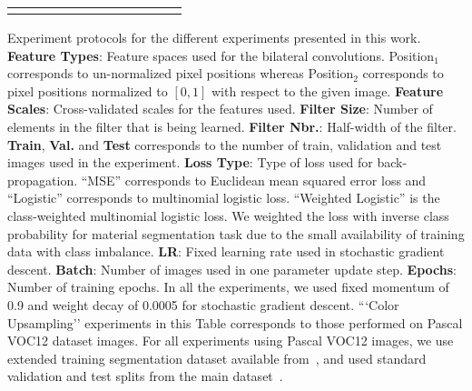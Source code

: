 \begin{table*}[h]
\begin{tabular}{L{2.5cm} L{2.8cm} C{1.6cm} C{0.8cm} C{0.6cm} C{0.7cm} C{0.7cm} C{0.7cm} C{1.6cm} C{0.7cm} C{0.7cm} C{0.7cm}}
      \bottomrule
      \\
    \end{tabular}
     {Experiment protocols for the different experiments presented in this work. \textbf{Feature Types}:
    Feature spaces used for the bilateral convolutions. Position$_1$ corresponds to un-normalized pixel positions whereas Position$_2$ corresponds
    to pixel positions normalized to $[0,1]$ with respect to the given image. \textbf{Feature Scales}: Cross-validated scales for the features used.
     \textbf{Filter Size}: Number of elements in the filter that is being learned. \textbf{Filter Nbr.}: Half-width of the filter. \textbf{Train},
     \textbf{Val.} and \textbf{Test} corresponds to the number of train, validation and test images used in the experiment. \textbf{Loss Type}: Type
     of loss used for back-propagation. ``MSE'' corresponds to Euclidean mean squared error loss and ``Logistic'' corresponds to multinomial logistic
     loss. ``Weighted Logistic'' is the class-weighted multinomial logistic loss. We weighted the loss with inverse class probability for material
     segmentation task due to the small availability of training data with class imbalance. \textbf{LR}: Fixed learning rate used in stochastic gradient
     descent. \textbf{Batch}: Number of images used in one parameter update step. \textbf{Epochs}: Number of training epochs. In all the experiments,
     we used fixed momentum of 0.9 and weight decay of 0.0005 for stochastic gradient descent. ```Color Upsampling'' experiments in this Table corresponds
     to those performed on Pascal VOC12 dataset images. For all experiments using Pascal VOC12 images, we use extended
     training segmentation dataset available from~\cite{hariharan2011moredata}, and used standard validation and test splits
     from the main dataset~\cite{voc2012segmentation}.}
  \label{tbl:parameters}
\end{table*}

